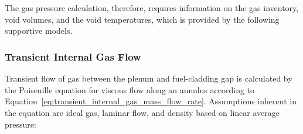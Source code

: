 \\
\\
The gas pressure calculation, therefore, requires information on the gas
inventory, void volumes, and the void temperatures, which is provided by
the following supportive models.
\subsubsection{Transient Internal Gas Flow} \label{section:transient-internal-gas-flow}

Transient flow of gas between the plenum and fuel-cladding gap is
calculated by the Poiseuille equation for viscous flow along an annulus
according to Equation~\ref{eq:transient_internal_gas_mass_flow_rate}. Assumptions inherent in the equation 
are ideal gas, laminar flow, and density based on linear average pressure:

